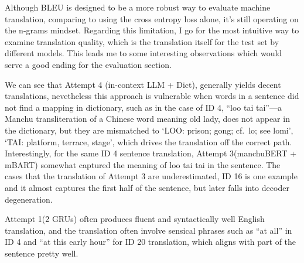 \documentclass[
  letterpaper,
  DIV=11,
  numbers=noendperiod]{scrartcl}
\begin{document}
Although BLEU is designed to be a more robust way to evaluate machine
translation, comparing to using the cross entropy loss alone, it's still
operating on the n-grams mindset. Regarding this limitation, I go for
the most intuitive way to examine translation quality, which is the
translation itself for the test set by different models. This leads me
to some interesting observations which would serve a good ending for the
evaluation section.

We can see that Attempt 4 (in-context LLM + Dict), generally yields
decent translations, nevetheless this approach is vulnerable when words
in a sentence did not find a mapping in dictionary, such as in the case
of ID 4, ``loo tai tai''---a Manchu transliteration of a Chinese word
meaning old lady, does not appear in the dictionary, but they are
mismatched to `LOO: prison; gong; cf.~lo; see lomi', `TAI: platform,
terrace, stage', which drives the translation off the correct path.
Interestingly, for the same ID 4 sentence translation, Attempt
3(manchuBERT + mBART) somewhat captured the meaning of loo tai tai in
the sentence. The cases that the translation of Attempt 3 are
underestimated, ID 16 is one example and it almost captures the first
half of the sentence, but later falls into decoder degeneration.

Attempt 1(2 GRUs) often produces fluent and syntactically well English
translation, and the translation often involve sensical phrases such as
``at all'' in ID 4 and ``at this early hour'' for ID 20 translation,
which aligns with part of the sentence pretty well.
\end{document}

